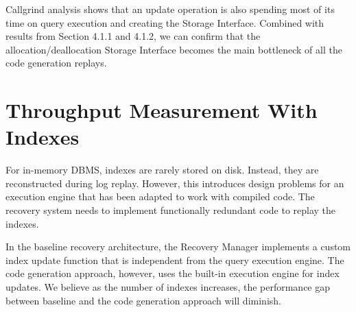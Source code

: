 \documentclass[12pt]{cmuthesis}
\begin{document}
\begin{table}[H]
\begin{center}
\caption{\textbf{Callgrind breakdown on the Query Execution step of an Update Replay step}.}
\label{tab:throughput_exp_update_overhead_all}
\end{center}
\end{table}

Callgrind analysis shows that an update operation is also spending most of its time on query execution and creating the Storage Interface. Combined with results from Section 4.1.1 and 4.1.2, we can confirm that the allocation/deallocation Storage Interface becomes the main bottleneck of all the code generation replays.

\section{Throughput Measurement With Indexes}
For in-memory DBMS, indexes are rarely stored on disk. Instead, they are reconstructed during log replay. However, this introduces design problems for an execution engine that has been adapted to work with compiled code. The recovery system needs to implement functionally redundant code to replay the indexes.

In the baseline recovery architecture, the Recovery Manager implements a custom index update function that is independent from the query execution engine. The code generation approach, however, uses the built-in execution engine for index updates. We believe as the number of indexes increases, the performance gap between baseline and the code generation approach will diminish.
\end{document}
